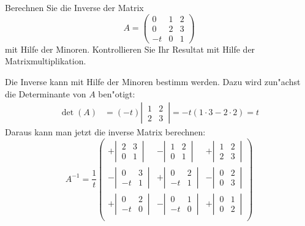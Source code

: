 Berechnen Sie die Inverse der Matrix
\[
A=
\begin{pmatrix}
 0& 1& 2\\
 0& 2& 3\\
-t& 0& 1
\end{pmatrix}
\]
mit Hilfe der Minoren. Kontrollieren Sie Ihr Resultat
mit Hilfe der Matrixmultiplikation.

\begin{loesung}
Die Inverse kann mit Hilfe der Minoren bestimm werden. Dazu wird zun"achst die
Determinante von $A$ ben"otigt:
\begin{align*}
\det(A)&=(-t)\left|\,
\begin{matrix}
1&2\\2&3
\end{matrix}
\,\right|
=
-t(1\cdot 3-2\cdot 2)=t
\end{align*}
Daraus kann man jetzt die inverse Matrix berechnen:
\[
A^{-1}
=
\frac1t
\begin{pmatrix}
 +\left|\,\begin{matrix} 2&3\\0&1\end{matrix}\,\right|
&-\left|\,\begin{matrix} 1&2\\0&1\end{matrix}\,\right|
&+\left|\,\begin{matrix} 1&2\\2&3\end{matrix}\,\right|\\
 -\left|\,\begin{matrix} 0&3\\-t&1\end{matrix}\,\right|
&+\left|\,\begin{matrix} 0&2\\-t&1\end{matrix}\,\right|
&-\left|\,\begin{matrix} 0&2\\0&3\end{matrix}\,\right|\\
 +\left|\,\begin{matrix} 0&2\\-t&0\end{matrix}\,\right|
&-\left|\,\begin{matrix} 0&1\\-t&0\end{matrix}\,\right|
&+\left|\,\begin{matrix} 0&1\\0&2\end{matrix}\,\right|\\

\end{pmatrix}\]
\end{loesung}
